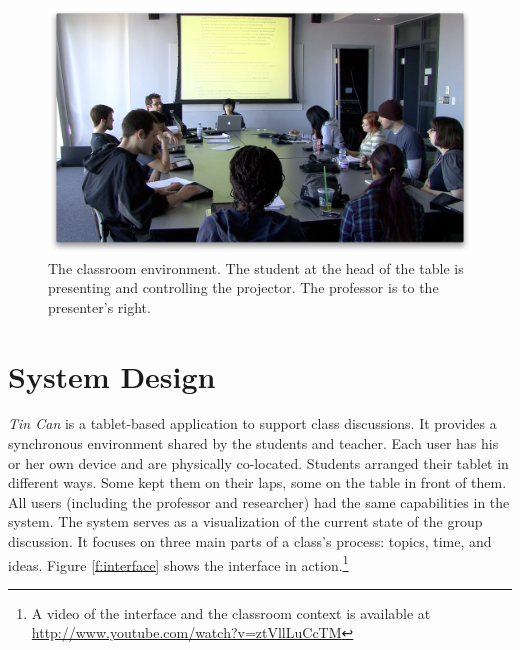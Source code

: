 \begin{figure}[t]
\centering
\includegraphics{figures/tincan/classroom_overview.png}
\caption{The classroom environment. The student at the head of the table is presenting and controlling the projector. The professor is to the presenter's right.}
\label{f:classroom}
\end{figure}


\section{System Design}
 
\emph{Tin Can} is a tablet-based application to support class discussions. It provides a synchronous environment shared by the students and teacher. Each user has his or her own device and are physically co-located. Students arranged their tablet in different ways. Some kept them on their laps, some on the table in front of them. All users (including the professor and researcher) had the same capabilities in the system. The system serves as a visualization of the current state of the group discussion. It focuses on three main parts of a class's process: topics, time, and ideas. Figure \ref{f:interface} shows the interface in action.\footnote{A video of the interface and the classroom context is available at \url{http://www.youtube.com/watch?v=ztVllLuCcTM}}

